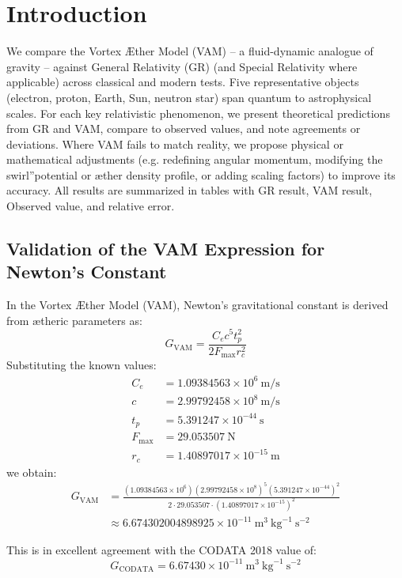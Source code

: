 
\section*{Introduction}
We compare the Vortex Æther Model (VAM) – a fluid-dynamic analogue of gravity – against General Relativity (GR) (and Special Relativity where applicable) across classical and modern tests. Five representative objects (electron, proton, Earth, Sun, neutron star) span quantum to astrophysical scales. For each key relativistic phenomenon, we present theoretical predictions from GR and VAM, compare to observed values, and note agreements or deviations. Where VAM fails to match reality, we propose physical or mathematical adjustments (e.g. redefining angular momentum, modifying the \grqq swirl\textquotedblright potential or æther density profile, or adding scaling factors) to improve its accuracy. All results are summarized in tables with GR result, VAM result, Observed value, and relative error.

\subsection*{Validation of the VAM Expression for Newton's Constant}

In the Vortex Æther Model (VAM), Newton's gravitational constant is derived from ætheric parameters as:
\begin{equation}
G_\text{VAM} = \frac{C_e c^5 t_p^2}{2 F_{\max} r_c^2}
\end{equation}
Substituting the known values:
\begin{align*}
C_e &= 1.09384563 \times 10^6 \ \text{m/s} \\
c &= 2.99792458 \times 10^8 \ \text{m/s} \\
t_p &= 5.391247 \times 10^{-44} \ \text{s} \\
F_{\max} &= 29.053507 \ \text{N} \\
r_c &= 1.40897017 \times 10^{-15} \ \text{m}
\end{align*}
we obtain:
\begin{align*}
G_\text{VAM} &= \frac{(1.09384563 \times 10^6)(2.99792458 \times 10^8)^5 (5.391247 \times 10^{-44})^2}{2 \cdot 29.053507 \cdot (1.40897017 \times 10^{-15})^2} \\
&\approx 6.674302004898925 \times 10^{-11} \ \text{m}^3 \ \text{kg}^{-1} \ \text{s}^{-2}
\end{align*}

This is in excellent agreement with the CODATA 2018 value of:
\[
G_\text{CODATA} = 6.67430 \times 10^{-11} \ \text{m}^3 \ \text{kg}^{-1} \ \text{s}^{-2}
\]

